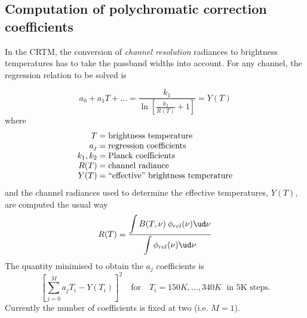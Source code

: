 \subsection{Computation of polychromatic correction coefficients}
In the CRTM, the conversion of \emph{channel resolution} radiances to brightness temperatures has to take the passband widths into account. For any channel, the regression relation to be solved is

\begin{equation}
  a_0 + a_1T + \ldots = \frac{\displaystyle k_1}{\displaystyle \ln\left[\frac{k_2}{R(T)}+1\right]} = Y(T)
\end{equation}
where
\begin{equation}
  \begin{array}{r@{\;=\;}l}
         T &\mbox{brightness temperature} \\
        a_j&\mbox{regression coefficients} \\
    k_1,k_2&\mbox{Planck coefficients} \\
       R(T)&\mbox{channel radiance} \\
       Y(T)&\mbox{``effective'' brightness temperature}
  \end{array}
\end{equation}
and the channel radiances used to determine the effective temperatures, $Y(T)$, are computed the usual way
\begin{equation}
  R(T) = \frac{\displaystyle\int{B(T,\nu)\:\phi_{rel}(\nu)\ud \nu}}{\displaystyle\int{\phi_{rel}(\nu)\ud \nu}}
\end{equation}
The quantity minimised to obtain the $a_j$ coefficients is
\begin{equation}
  \left[ \sum_{j=0}^{M}a_j T_{i} - Y(T_{i}) \right]^2 \quad\mbox{for}\quad T_i = 150K, \ldots, 340K \;\mbox{ in 5K steps.}
\end{equation}
Currently the number of coefficients is fixed at two (i.e. $M=1$).
